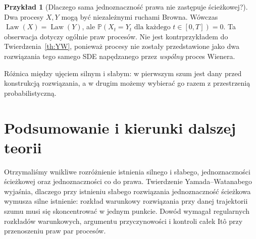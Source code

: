 \documentclass[11pt,a4paper,oneside]{report}
\numberwithin{equation}{chapter}
\theoremstyle{plain}
\theoremstyle{definition}
\newtheorem{przyklad}{Przykład}[chapter]
\theoremstyle{remark}
\newcommand{\Prob}{\mathbb{P}}
\newcommand{\Law}{\operatorname{Law}}
\begin{document}
\begin{przyklad}[Dlaczego sama jednoznaczność prawa nie zastępuje ścieżkowej?]
Dwa procesy $X,Y$ mogą być niezależnymi ruchami Browna.
Wówczas $\Law(X)=\Law(Y)$, ale
$\Prob(X_t=Y_t\text{ dla każdego }t\in[0,T])=0$.
Ta obserwacja dotyczy ogólnie praw procesów. Nie jest
kontrprzykładem do Twierdzenia~\ref{th:YW}, ponieważ
procesy nie zostały przedstawione jako dwa rozwiązania
tego samego SDE napędzanego przez \emph{wspólny} proces
Wienera.
\end{przyklad}

\begin{center}
\par\smallskip\small
Różnica między ujęciem silnym i słabym: w pierwszym
szum jest dany przed konstrukcją rozwiązania, a w drugim
możemy wybierać go razem z przestrzenią probabilistyczną.
\end{center}

\section{Podsumowanie i kierunki dalszej teorii}

Otrzymaliśmy wnikliwe rozróżnienie istnienia silnego i słabego,
jednoznaczności ścieżkowej oraz jednoznaczności co do prawa.
Twierdzenie Yamada--Watanabego wyjaśnia, dlaczego przy
istnieniu słabego rozwiązania jednoznaczność ścieżkowa
wymusza silne istnienie: rozkład warunkowy rozwiązania
przy danej trajektorii szumu musi się skoncentrować w jednym
punkcie. Dowód wymagał regularnych rozkładów warunkowych,
argumentu przyczynowości i kontroli całek Itô przy
przenoszeniu praw par procesów.
\end{document}

